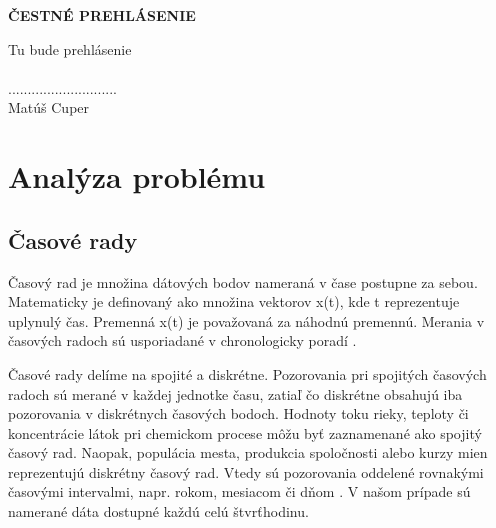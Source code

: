 \documentclass[a4paper,slovak,12pt,appendix]{article}
\begin{document}
\newpage
\thispagestyle{plain}
\vspace*{15cm}
\begin{large}
  \noindent \textbf{ČESTNÉ PREHLÁSENIE} \\
\end{large}
\noindent
Tu bude prehlásenie \\
\vspace*{0.5cm}\\
\hspace*{10cm}............................\\
\hspace*{10.7cm} Matúš Cuper


\newpage
\tableofcontents


\newpage
\section{Analýza problému}


\subsection{Časové rady}
Časový rad je množina dátových bodov nameraná v čase postupne za sebou.
Matematicky je definovaný ako množina vektorov x(t), kde t reprezentuje
uplynulý čas. Premenná x(t) je považovaná za náhodnú premennú.
Merania v časových radoch sú usporiadané v chronologicky
poradí \cite{Agrawal2013}.

Časové rady delíme na spojité a diskrétne. Pozorovania pri spojitých časových
radoch sú merané v každej jednotke času, zatiaľ čo diskrétne obsahujú iba
pozorovania v diskrétnych časových bodoch. Hodnoty toku rieky, teploty
či koncentrácie látok pri chemickom procese môžu byť zaznamenané ako spojitý
časový rad. Naopak, populácia mesta, produkcia spoločnosti alebo kurzy mien
reprezentujú diskrétny časový rad. Vtedy sú pozorovania oddelené rovnakými
časovými intervalmi, napr. rokom, mesiacom či dňom \cite{Agrawal2013}. V našom
prípade sú namerané dáta dostupné každú celú štvrťhodinu.
\end{document}
